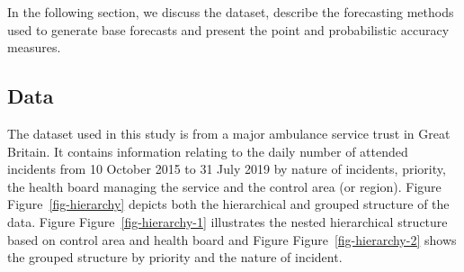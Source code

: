 \documentclass[
  authoryear,
  preprint,
  3p]{elsarticle}
\begin{document}
In the following section, we discuss the dataset, describe the
forecasting methods used to generate base forecasts and present the
point and probabilistic accuracy measures.

\hypertarget{sec-data}{%
\subsection{Data}\label{sec-data}}

The dataset used in this study is from a major ambulance service trust
in Great Britain. It contains information relating to the daily number
of attended incidents from 10 October 2015 to 31 July 2019 by nature of
incidents, priority, the health board managing the service and the
control area (or region). Figure Figure~\ref{fig-hierarchy} depicts both
the hierarchical and grouped structure of the data. Figure
Figure~\ref{fig-hierarchy-1} illustrates the nested hierarchical
structure based on control area and health board and Figure
Figure~\ref{fig-hierarchy-2} shows the grouped structure by priority and
the nature of incident.
\end{document}
